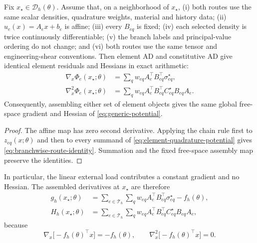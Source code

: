 \begin{proposition}
\label{prop:branchwise-route-equivalence}
Fix $x_\star\in\mathcal{D}_h(\theta)$. Assume that, on a neighborhood of
$x_\star$,
(i) both routes use the same scalar densities, quadrature weights, material and
history data; (ii) $u_e(x)=A_e x+b_e$ is affine; (iii) every $B_{eq}$ is fixed;
(iv) each selected density is twice continuously differentiable; (v) the
branch labels and principal-value ordering do not change; and (vi) both routes
use the same tensor and engineering-shear conventions. Then element AD and
constitutive AD give identical element residuals and Hessians in exact
arithmetic:
\begin{align}
  \nabla_x\Phi_e(x_\star;\theta)
  &=\sum_q w_{eq}A_e^\top B_{eq}^\top\sigma_{eq}^\star,
  \nonumber\\
  \nabla_x^2\Phi_e(x_\star;\theta)
  &=\sum_q w_{eq}A_e^\top B_{eq}^\top
    C_{eq}^\star B_{eq}A_e.
  \label{eq:branchwise-route-identity}
\end{align}
Consequently, assembling either set of element objects gives the same global
free-space gradient and Hessian of \eqref{eq:generic-potential}.
\end{proposition}

\begin{proof}
The affine map has zero second derivative. Applying the chain rule first to
$z_{eq}(x;\theta)$ and then to every summand of
\eqref{eq:element-quadrature-potential} gives
\eqref{eq:branchwise-route-identity}. Summation and the fixed free-space
assembly map preserve the identities.
\end{proof}

In particular, the linear external load contributes a constant gradient and
no Hessian. The assembled derivatives at $x_\star$ are therefore
\begin{align}
  g_h(x_\star;\theta)
  &=\sum_{e\in\mathcal{T}_h}\sum_q
    w_{eq}A_e^\top B_{eq}^\top\sigma_{eq}^\star-f_h(\theta),
  \nonumber\\
  H_h(x_\star;\theta)
  &=\sum_{e\in\mathcal{T}_h}\sum_q
    w_{eq}A_e^\top B_{eq}^\top C_{eq}^\star B_{eq}A_e,
  \label{eq:assembled-gradient-hessian}
\end{align}
because
\begin{equation}
  \nabla_x\bigl[-f_h(\theta)^\top x\bigr]=-f_h(\theta),
  \qquad
  \nabla_x^2\bigl[-f_h(\theta)^\top x\bigr]=0.
  \label{eq:external-load-derivatives}
\end{equation}

